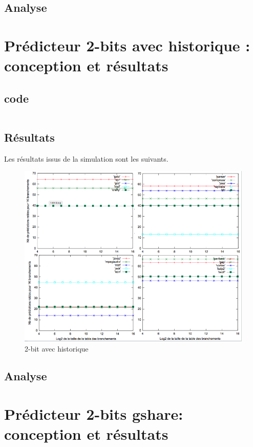 \documentclass[a4paper]{article}
\begin{document}
\subsection{Analyse}

\section{Prédicteur 2-bits avec historique : conception et résultats}
\subsection{code}

\small
\begin{verbatim}
\end{verbatim}
\normalsize

\subsection{Résultats}

Les résultats issus de la simulation sont les suivants.
\begin{figure}[t]
\includegraphics[width=\linewidth]{2-bit-hist.png}
\caption{2-bit avec historique}
\centering
\end{figure}

\subsection{Analyse}

\section{Prédicteur 2-bits gshare: conception et résultats}
\end{document}
